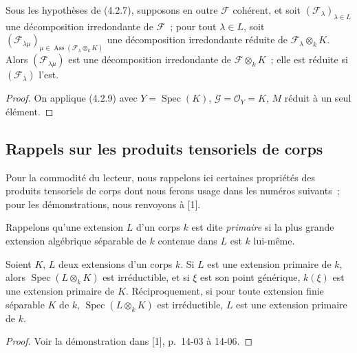 \begin{corollary}[4.2.10]
\label{IV.2.4.2.10-fr}
Sous les hypothèses de (4.2.7), supposons en outre $\mathcal F$ cohérent, et
soit $(\mathcal F_\lambda)_{\lambda\in L}$ une décomposition irredondante de
$\mathcal F$~; pour tout $\lambda\in L$, soit
$(\mathcal F_{\lambda\mu})_{\mu\in
\operatorname{Ass}(\mathcal F_\lambda\otimes_k K)}$ une décomposition
irredondante réduite de $\mathcal F_\lambda\otimes_k K$. Alors
$(\mathcal F_{\lambda\mu})$ est une décomposition irredondante de
$\mathcal F\otimes_k K$~; elle est réduite si $(\mathcal F_\lambda)$ l'est.
\end{corollary}

\begin{proof}
On applique (4.2.9) avec $Y=\operatorname{Spec}(K)$,
$\mathcal G=\mathcal O_Y=K$, $M$ réduit à un seul élément.
\end{proof}


\subsection{Rappels sur les produits tensoriels de corps}
\label{subsection:IV.2.4.3-fr}

Pour la commodité du lecteur, nous rappelons ici certaines propriétés des
produits tensoriels de corps dont nous ferons usage dans les numéros suivants~;
pour les démonstrations, nous renvoyons à [1].

\begin{env}[4.3.1]
\label{IV.2.4.3.1-fr}
Rappelons qu'une extension $L$ d'un corps $k$ est dite \emph{primaire} si la
plus grande extension algébrique séparable de $k$ contenue dans $L$ est
$k$ lui-même.
\end{env}

\begin{proposition}[4.3.2]
\label{IV.2.4.3.2-fr}
Soient $K$, $L$ deux extensions d'un corps $k$. Si $L$ est une extension
primaire de $k$, alors $\operatorname{Spec}(L\otimes_k K)$ est irréductible,
et si $\xi$ est son point générique, $k(\xi)$ est une extension primaire de
$K$. Réciproquement, si pour toute extension finie séparable $K$ de $k$,
$\operatorname{Spec}(L\otimes_k K)$ est irréductible, $L$ est une extension
primaire de $k$.
\end{proposition}

\begin{proof}
Voir la démonstration dans [1], p.~14-03 à 14-06.
\end{proof}

